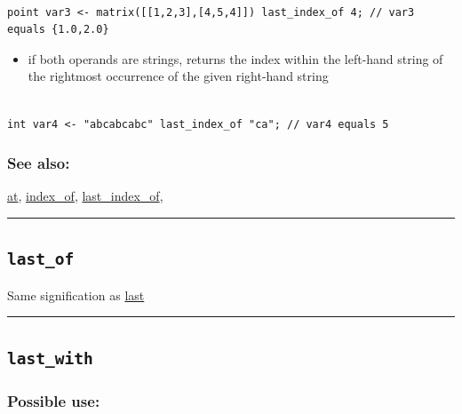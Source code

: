 \documentclass[]{book}
\providecommand{\tightlist}{%
  \setlength{\itemsep}{0pt}\setlength{\parskip}{0pt}}
\theoremstyle{definition}
\theoremstyle{definition}
\theoremstyle{definition}
\theoremstyle{remark}
\begin{document}
\begin{verbatim}
 
point var3 <- matrix([[1,2,3],[4,5,4]]) last_index_of 4; // var3 equals {1.0,2.0}
\end{verbatim}

\begin{itemize}
\tightlist
\item
  if both operands are strings, returns the index within the left-hand
  string of the rightmost occurrence of the given right-hand string
\end{itemize}

\begin{verbatim}
 
int var4 <- "abcabcabc" last_index_of "ca"; // var4 equals 5
\end{verbatim}

\subsubsection{See also:}\label{see-also-123}

\href{operators-a-to-a.html\#at}{at},
\href{operators-i-to-m.html\#index_of}{index\_of},
\href{operators-i-to-m.html\#last_index_of}{last\_index\_of},

\begin{center}\rule{0.5\linewidth}{\linethickness}\end{center}

\subsection{\texorpdfstring{\texttt{last\_of}}{last\_of}}\label{last_of}

Same signification as \href{operators-i-to-m.html\#last}{last}

\begin{center}\rule{0.5\linewidth}{\linethickness}\end{center}

\subsection{\texorpdfstring{\texttt{last\_with}}{last\_with}}\label{last_with}

\subsubsection{Possible use:}\label{possible-use-318}
\end{document}
